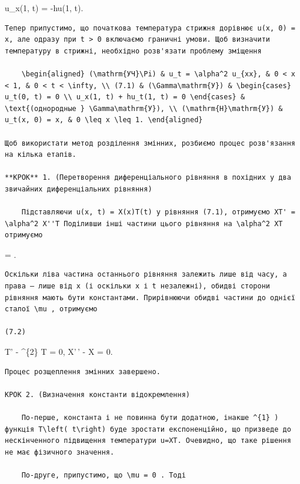 \documentclass[
  ukrainian,
]{article}
\begin{document}
u\_x(1, t) = -hu(1, t).

\begin{verbatim}
Тепер припустимо, що початкова температура стрижня дорівнює u(x, 0) = x, але одразу при t > 0 включаємо граничні умови. Щоб визначити температуру в стрижні, необхідно розв'язати проблему зміщення

    \begin{aligned} (\mathrm{УЧ}\Pi) & u_t = \alpha^2 u_{xx}, & 0 < x < 1, & 0 < t < \infty, \\ (7.1) & (\Gamma\mathrm{У}) & \begin{cases} u_t(0, t) = 0 \\ u_x(1, t) + hu_t(1, t) = 0 \end{cases} & \text{(однородные } \Gamma\mathrm{У}), \\ (\mathrm{H}\mathrm{У}) & u_t(x, 0) = x, & 0 \leq x \leq 1. \end{aligned}

Щоб використати метод розділення змінних, розбиємо процес розв'язання на кілька етапів.

**КРОК** 1. (Перетворення диференціального рівняння в похідних у два звичайних диференціальних рівняння)

    Підставляючи u(x, t) = X(x)T(t) у рівняння (7.1), отримуємо XT' = \alpha^2 X''T Поділивши інші частини цього рівняння на \alpha^2 XT отримуємо
\end{verbatim}

 =  .

\begin{verbatim}
Оскільки ліва частина останнього рівняння залежить лише від часу, а права — лише від x (і оскільки x і t незалежні), обидві сторони рівняння мають бути константами. Прирівнюючи обидві частини до однієї сталої \mu , отримуємо

(7.2)
\end{verbatim}

T' - \mu \alpha\^{}\{2\} T = 0, X'\,' - \mu X = 0.

\begin{verbatim}
Процес розщеплення змінних завершено.

КРОК 2. (Визначення константи відокремлення)

    По-перше, константа і не повинна бути додатною, інакше ^{1} ) функція T\left( t\right) буде зростати експоненційно, що призведе до нескінченного підвищення температури u=XT. Очевидно, що таке рішення не має фізичного значення.

    По-друге, припустимо, що \mu = 0 . Тоді
\end{verbatim}
\end{document}
